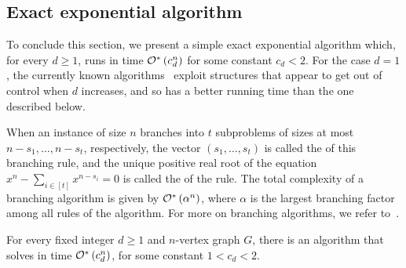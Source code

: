 \subsection{Exact exponential algorithm}
\label{sec:exact-algo}

To conclude this section, we present a simple exact exponential algorithm which, for every $d \geq 1$, runs in time $\mathcal{O}^*\left(c_d^n\right)$ for some constant $c_d < 2$.
For the case $d=1$, the currently known algorithms~\cite{matching_cut_tcs,matching_cut_ipec} exploit structures that appear to get out of control when $d$ increases, and so has a better running time than the one described below.

When an instance of size $n$ branches into $t$ subproblems of sizes at most $n - s_1, \dots, n - s_t$, respectively, the vector $(s_1, \dots, s_t)$ is called the  of this branching rule, and the unique positive real root of the equation $x^n - \sum_{i \in [t]} x^{n - s_i} = 0$ is called the  of the rule.
The total complexity of a branching algorithm is given by $\mathcal{O}^*\left(\alpha^n\right)$, where $\alpha$ is the largest branching factor among all rules of the algorithm.
For more on branching algorithms, we refer to~\cite{exact_exponential_algorithms}.

\begin{theorem}
    For every fixed integer $d \geq 1$ and $n$-vertex graph $G$, there is an algorithm that solves  in time $\mathcal{O}^*\left(c_d^n\right)$, for some constant $1 < c_d < 2$.
\end{theorem}

